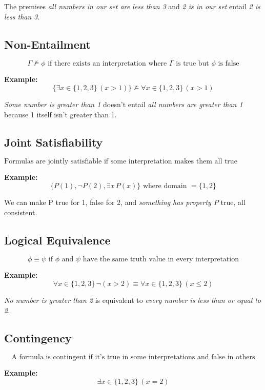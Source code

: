 \documentclass[12pt,a4paper,openany]{article}
\begin{document}
The premises \textit{all numbers in our set are less than 3} and \textit{2 is in our set} entail \textit{2 is less than 3}.

\subsection{Non-Entailment}

$$\Gamma \not\models \phi \text{ if there exists an interpretation where } \Gamma \text{ is true but } \phi \text{ is false}$$

\textbf{Example:} 
$$\{\exists x \in \{1,2,3\} \, (x > 1)\} \not\models \forall x \in \{1,2,3\} \, (x > 1)$$

\textit{Some number is greater than 1} doesn't entail \textit{all numbers are greater than 1} because 1 itself isn't greater than 1.

\subsection{Joint Satisfiability}

$$\text{Formulas are jointly satisfiable if some interpretation makes them all true simultaneously}$$

\textbf{Example:} 
$$\{P(1), \neg P(2), \exists x \, P(x)\} \text{ where domain } = \{1,2\}$$

We can make P true for 1, false for 2, and \textit{something has property $P$} true, all consistent.

\subsection{Logical Equivalence}

$$\phi \equiv \psi \text{ if } \phi \text{ and } \psi \text{ have the same truth value in every interpretation}$$

\textbf{Example:} 
$$\forall x \in \{1,2,3\} \, \neg(x > 2) \equiv \forall x \in \{1,2,3\} \, (x \leq 2)$$

\textit{No number is greater than 2} is equivalent to \textit{every number is less than or equal to 2}.

\subsection{Contingency}

$$\text{A formula is contingent if it's true in some interpretations and false in others}$$

\textbf{Example:} 
$$\exists x \in \{1,2,3\} \, (x = 2)$$
\end{document}
